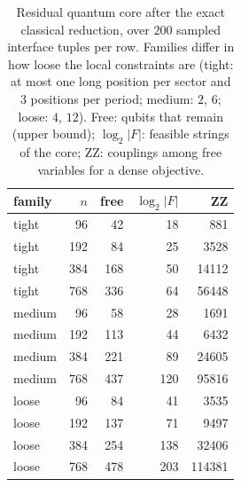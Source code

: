 \begin{table}[t]
\centering\footnotesize\setlength{\tabcolsep}{4pt}
\caption{ Residual quantum core after the exact classical reduction, over $200$ sampled interface tuples per row. Families differ in how loose the local constraints are (tight: at most one long position per sector and $3$ positions per period; medium: $2$, $6$; loose: $4$, $12$). Free: qubits that remain (upper bound); $\log_2|F|$: feasible strings of the core; ZZ: couplings among free variables for a dense objective.}\label{tab:core_map}
\begin{tabular}{lrrrr}
\toprule
family & $n$ & free & $\log_2|F|$ & ZZ\\
\midrule
tight & 96 & 42 & 18 & 881\\
tight & 192 & 84 & 25 & 3528\\
tight & 384 & 168 & 50 & 14112\\
tight & 768 & 336 & 64 & 56448\\
medium & 96 & 58 & 28 & 1691\\
medium & 192 & 113 & 44 & 6432\\
medium & 384 & 221 & 89 & 24605\\
medium & 768 & 437 & 120 & 95816\\
loose & 96 & 84 & 41 & 3535\\
loose & 192 & 137 & 71 & 9497\\
loose & 384 & 254 & 138 & 32406\\
loose & 768 & 478 & 203 & 114381\\
\bottomrule
\end{tabular}
\end{table}
